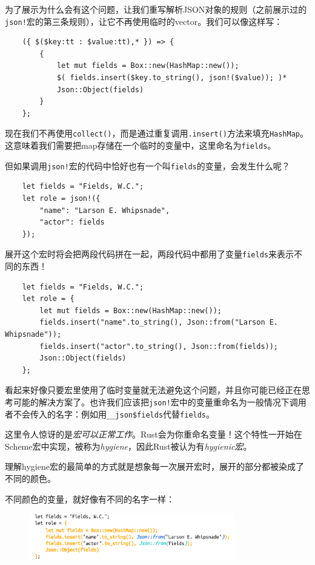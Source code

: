 为了展示为什么会有这个问题，让我们重写解析JSON对象的规则（之前展示过的\texttt{json!}宏的第三条规则），让它不再使用临时的vector。我们可以像这样写：
\begin{verbatim}
    ({ $($key:tt : $value:tt),* }) => {
        {
            let mut fields = Box::new(HashMap::new());
            $( fields.insert($key.to_string(), json!($value)); )*
            Json::Object(fields)
        }
    };
\end{verbatim}

现在我们不再使用\texttt{collect()}，而是通过重复调用\texttt{.insert()}方法来填充\texttt{HashMap}。这意味着我们需要把map存储在一个临时的变量中，这里命名为\texttt{fields}。

但如果调用\texttt{json!}宏的代码中恰好也有一个叫\texttt{fields}的变量，会发生什么呢？
\begin{verbatim}
    let fields = "Fields, W.C.";
    let role = json!({
        "name": "Larson E. Whipsnade",
        "actor": fields
    });
\end{verbatim}

展开这个宏时将会把两段代码拼在一起，两段代码中都用了变量\texttt{fields}来表示不同的东西！
\begin{verbatim}
    let fields = "Fields, W.C.";
    let role = {
        let mut fields = Box::new(HashMap::new());
        fields.insert("name".to_string(), Json::from("Larson E. Whipsnade"));
        fields.insert("actor".to_string(), Json::from(fields));
        Json::Object(fields)
    };
\end{verbatim}

看起来好像只要宏里使用了临时变量就无法避免这个问题，并且你可能已经正在思考可能的解决方案了。也许我们应该把\texttt{json!}宏中的变量重命名为一般情况下调用者不会传入的名字：例如用\texttt{\_\_json\$fields}代替\texttt{fields}。

这里令人惊讶的是\emph{宏可以正常工作}。Rust会为你重命名变量！这个特性一开始在Scheme宏中实现，被称为\emph{hygiene}，因此Rust被认为有\emph{hygienic宏}。

理解hygiene宏的最简单的方式就是想象每一次展开宏时，展开的部分都被染成了不同的颜色。

不同颜色的变量，就好像有不同的名字一样：
\begin{figure}[h]
    \centering
    \includegraphics[width=0.8\textwidth]{../img/f21-4.png}
\end{figure}

